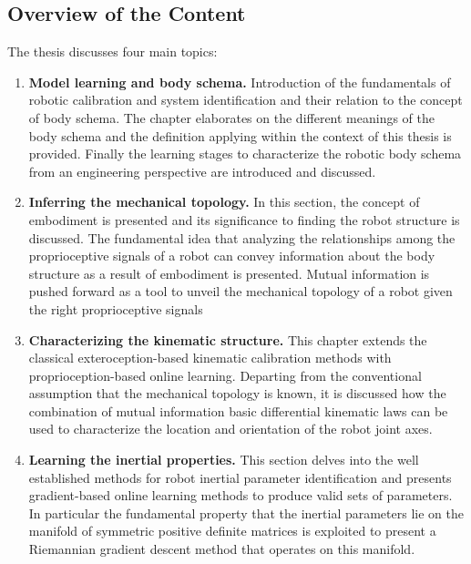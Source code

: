 \documentclass[12pt, a4paper]{article}
\begin{document}
\subsection*{Overview of the Content}
The thesis discusses four main topics:
\begin{enumerate}
	\item \textbf{Model learning and body schema.} Introduction of the fundamentals of robotic calibration and system identification and their relation to the concept of body schema. The chapter elaborates on the different meanings of the body schema and the definition applying within the context of this thesis is provided. Finally the learning stages to characterize the robotic body schema from an engineering perspective are introduced and discussed.
	
	\item \textbf{Inferring the mechanical topology.} In this section, the concept of embodiment is presented and its significance to finding the robot structure is discussed. The fundamental idea that analyzing the relationships among the proprioceptive signals of a robot can convey information about the body structure as a result of embodiment is presented. Mutual information is pushed forward as a tool to unveil the mechanical topology of a robot given the right proprioceptive signals
	
	
	
	\item \textbf{Characterizing the kinematic structure.} This chapter extends the classical exteroception-based kinematic calibration methods with proprioception-based online learning. Departing from the conventional assumption that the mechanical topology is known, it is discussed how the combination of mutual information basic differential kinematic laws can be used to characterize the location and orientation of the robot joint axes.
	
	\item \textbf{Learning the inertial properties.} This section delves into the well established methods for robot inertial parameter identification and presents gradient-based online learning methods to produce valid sets of parameters. In particular the fundamental property that the inertial parameters lie on the manifold of symmetric positive definite matrices is exploited to present a Riemannian gradient descent method that operates on this manifold. 
\end{enumerate}
\end{document}
